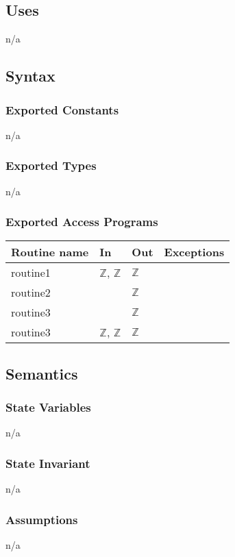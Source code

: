 \documentclass[12pt]{article}
\begin{document}
\subsection* {Uses}
n/a


\subsection* {Syntax}
\subsubsection* {Exported Constants}
n/a

\subsubsection* {Exported Types}
n/a

\subsubsection* {Exported Access Programs}
\begin{tabular}{| l | l | l | l |}
\hline
\textbf{Routine name} & \textbf{In} & \textbf{Out} & \textbf{Exceptions}\\
\hline
routine1 & $\mathbb{Z}$, $\mathbb{Z}$ & $\mathbb{Z}$ & \\
\hline
routine2 & ~ & $\mathbb{Z}$ & ~\\
\hline
routine3 & ~ & $\mathbb{Z}$ & ~\\
\hline
routine3 & $\mathbb{Z}$, $\mathbb{Z}$ & $\mathbb{Z}$ & ~\\
\hline
\end{tabular}


\subsection* {Semantics}
\subsubsection* {State Variables}
n/a

\subsubsection* {State Invariant}
n/a

\subsubsection* {Assumptions}
n/a
\end{document}
